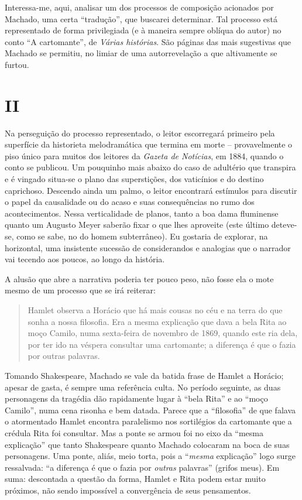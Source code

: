 Interessa-me, aqui, analisar um dos processos de composição acionados
por Machado, uma certa ``tradução'', que buscarei determinar. Tal
processo está representado de forma privilegiada (e à maneira sempre
oblíqua do autor) no conto ``A cartomante'', de \emph{Várias histórias}.
São páginas das mais sugestivas que Machado se permitiu, no limiar de
uma autorrevelação a que altivamente se furtou.

\section{II}

Na perseguição do processo representado, o leitor escorregará primeiro
pela superfície da historieta melodramática que termina em morte --
provavelmente o piso único para muitos dos leitores da \emph{Gazeta de
Notícias}, em 1884, quando o conto se publicou. Um pouquinho mais abaixo
do caso de adultério que transpira e é vingado situa-se o plano das
superstições, dos vaticínios e do destino caprichoso. Descendo ainda um
palmo, o leitor encontrará estímulos para discutir o papel da
causalidade ou do acaso e suas consequências no rumo dos acontecimentos.
Nessa verticalidade de planos, tanto a boa dama fluminense quanto um
Augusto Meyer saberão fixar o que lhes aproveite (este último deteve-se,
como se sabe, no do homem subterrâneo). Eu gostaria de explorar, na
horizontal, uma insistente sucessão de considerandos e analogias que o
narrador vai tecendo aos poucos, ao longo da história.

A alusão que abre a narrativa poderia ter pouco peso, não fosse ela o
mote mesmo de um processo que se irá reiterar:

\begin{quote}
Hamlet observa a Horácio que há mais cousas no céu e na terra do que
sonha a nossa filosofia. Era a mesma explicação que dava a bela Rita ao
moço Camilo, numa sexta-feira de novembro de 1869, quando este ria dela,
por ter ido na véspera consultar uma cartomante; a diferença é que o
fazia por outras palavras.
\end{quote}

Tomando Shakespeare, Machado se vale da batida frase de Hamlet a
Horácio; apesar de gasta, é sempre uma referência culta. No período
seguinte, as duas personagens da tragédia dão rapidamente lugar à ``bela
Rita'' e ao ``moço Camilo'', numa cena risonha e bem datada. Parece que
a ``filosofia'' de que falava o atormentado Hamlet encontra paralelismo
nos sortilégios da cartomante que a crédula Rita foi consultar. Mas a
ponte se armou foi no eixo da ``mesma explicação'' que tanto Shakespeare
quanto Machado colocaram na boca de suas personagens. Uma ponte, aliás,
meio torta, pois a ``\emph{mesma} explicação'' logo surge ressalvada:
``a diferença é que o fazia por \emph{outras} palavras'' (grifos meus).
Em suma: descontada a questão da forma, Hamlet e Rita podem estar muito
próximos, não sendo impossível a convergência de seus pensamentos.

